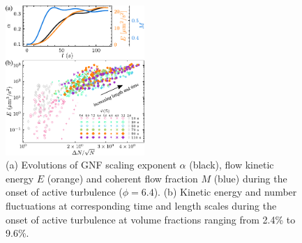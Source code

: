 \documentclass[twocolumn,aps,prl,amsmath,amssymb,longbibliography]{revtex4-2}
\begin{document}
\begin{figure}[!]
\begin{center}
\includegraphics[width=0.47\textwidth]{figures/GNF-energy-spectra-correlation-transient/v1.pdf}
\caption[The correlation between GNF and kinetic energy and kinetic energy spectra at transient state]
{
(a) Evolutions of GNF scaling exponent $\alpha$ (black), flow kinetic energy $E$ (orange) and coherent flow fraction $M$ (blue) during the onset of active turbulence ($\phi=6.4$).
(b) Kinetic energy and number fluctuations at corresponding time and length scales during the onset of active turbulence at volume fractions ranging from 2.4\% to 9.6\%.
}
\label{fig:GNF-energy-spectra-correlation-transient}
\end{center}
\end{figure}
\end{document}

